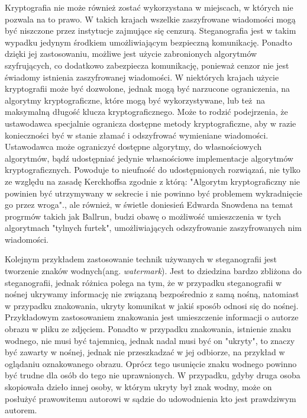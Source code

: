 \documentclass[a4paper, twoside]{report}
\begin{document}
        Kryptografia nie może również zostać wykorzystana w miejscach, w których
        nie pozwala na to prawo.\cite{CRYPTOGRAFYLAW} W takich krajach wszelkie
        zaszyfrowane wiadomości mogą być niszczone przez instytucje zajmujące się
        cenzurą. Steganografia jest w takim
        wypadku jedynym środkiem umożliwiającym bezpieczną komunikację. Ponadto
        dzięki jej zastosowaniu, możliwe jest użycie zabronionych algorytmów szyfrujących,
        co dodatkowo zabezpiecza komunikację, ponieważ cenzor nie jest świadomy
        istnienia zaszyfrowanej wiadomości. W niektórych krajach użycie kryptografii
        może być dozwolone, jednak mogą być narzucone ograniczenia, na algorytmy
        kryptograficzne, które mogą być wykorzystywane, lub też na maksymalną
        długość klucza kryptograficznego. Może to rodzić podejrzenia, że ustawodawca
        specjalnie ogranicza dostępne metody kryptograficzne, aby w razie konieczności
        być w stanie złamać i odszyfrować wymieniane wiadomości. Ustawodawca
        może ograniczyć dostępne algorytmy, do własnościowych algorytmów, bądź
        udostępniać jedynie własnościowe implementacje algorytmów kryptograficznych.
        Powoduje to nieufność do udostępnionych rozwiązań, nie tylko ze względu
        na zasadę Kerckhoffsa zgodnie z którą:
        "Algorytm kryptograficzny nie powinien być utrzymywany w sekrecie i nie powinno
        być problemem wykradnięcie go przez wroga".\cite{KERCKHOS}, ale również,
        w świetle doniesień Edwarda Snowdena na temat progrmów takich jak
        Ballrun\cite{WIKI:BALLRUN}, budzi obawę o możliwość umieszczenia w tych
        algorytmach "tylnych furtek", umożliwiających odszyfrowanie zaszyfrowanych
        nim wiadomości.

        Kolejnym przykładem zastosowanie technik używanych w steganografii jest
        tworzenie znaków wodnych(ang. \emph{watermark}). Jest to dziedzina bardzo zbliżona do steganografii,
        jednak różnica polega na tym, że w przypadku steganografii w nośnej ukrywamy
        informację nie związaną bezpośrednio z samą nośną, natomiast w przypadku znakowania,
        ukryty komunikat w jakiś sposób odnosi się do nośnej. Przykładowym zastosowaniem
        znakowania jest umieszczenie informacji o autorze obrazu w pliku ze zdjęciem.
        Ponadto w przypadku znakowania, istnienie znaku wodnego, nie musi być tajemnicą,
        jednak nadal musi być on "ukryty", to znaczy być zawarty w nośnej, jednak
        nie przeszkadzać w jej odbiorze, na przykład w oglądaniu oznakowanego obrazu.
        Oprócz tego usunięcie znaku wodnego powinno być trudne dla osób do tego nie
        uprawnionych. W przypadku, gdyby druga osoba skopiowała dzieło innej osoby,
        w którym ukryty był znak wodny, może on posłużyć prawowitemu autorowi w
        sądzie do udowodnienia kto jest prawdziwym autorem.
\end{document}
